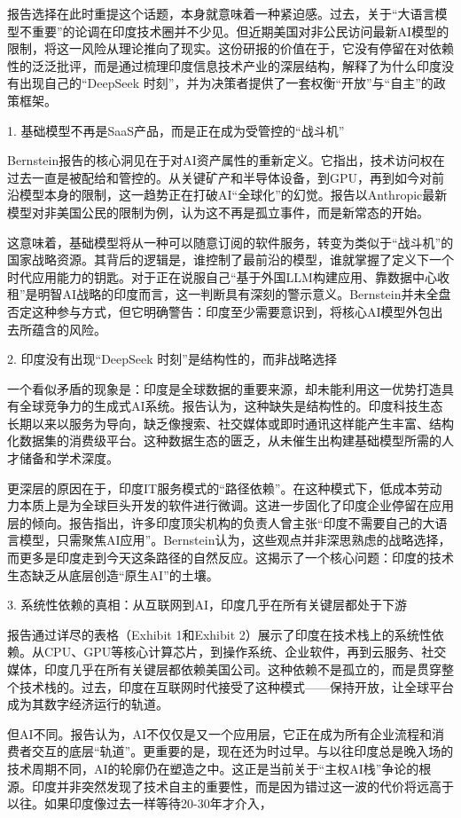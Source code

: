 \documentclass[11pt]{ctexart}
\begin{document}
报告选择在此时重提这个话题，本身就意味着一种紧迫感。过去，关于“大语言模型不重要”的论调在印度技术圈并不少见。但近期美国对非公民访问最新AI模型的限制，将这一风险从理论推向了现实。这份研报的价值在于，它没有停留在对依赖性的泛泛批评，而是通过梳理印度信息技术产业的深层结构，解释了为什么印度没有出现自己的“DeepSeek 时刻”，并为决策者提供了一套权衡“开放”与“自主”的政策框架。

1. 基础模型不再是SaaS产品，而是正在成为受管控的“战斗机”

Bernstein报告的核心洞见在于对AI资产属性的重新定义。它指出，技术访问权在过去一直是被配给和管控的。从关键矿产和半导体设备，到GPU，再到如今对前沿模型本身的限制，这一趋势正在打破AI“全球化”的幻觉。报告以Anthropic最新模型对非美国公民的限制为例，认为这不再是孤立事件，而是新常态的开始。

这意味着，基础模型将从一种可以随意订阅的软件服务，转变为类似于“战斗机”的国家战略资源。其背后的逻辑是，谁控制了最前沿的模型，谁就掌握了定义下一个时代应用能力的钥匙。对于正在说服自己“基于外国LLM构建应用、靠数据中心收租”是明智AI战略的印度而言，这一判断具有深刻的警示意义。Bernstein并未全盘否定这种参与方式，但它明确警告：印度至少需要意识到，将核心AI模型外包出去所蕴含的风险。

2. 印度没有出现“DeepSeek 时刻”是结构性的，而非战略选择

一个看似矛盾的现象是：印度是全球数据的重要来源，却未能利用这一优势打造具有全球竞争力的生成式AI系统。报告认为，这种缺失是结构性的。印度科技生态长期以来以服务为导向，缺乏像搜索、社交媒体或即时通讯这样能产生丰富、结构化数据集的消费级平台。这种数据生态的匮乏，从未催生出构建基础模型所需的人才储备和学术深度。

更深层的原因在于，印度IT服务模式的“路径依赖”。在这种模式下，低成本劳动力本质上是为全球巨头开发的软件进行微调。这进一步固化了印度企业停留在应用层的倾向。报告指出，许多印度顶尖机构的负责人曾主张“印度不需要自己的大语言模型，只需聚焦AI应用”。Bernstein认为，这些观点并非深思熟虑的战略选择，而更多是印度走到今天这条路径的自然反应。这揭示了一个核心问题：印度的技术生态缺乏从底层创造“原生AI”的土壤。

3. 系统性依赖的真相：从互联网到AI，印度几乎在所有关键层都处于下游

报告通过详尽的表格（Exhibit 1和Exhibit 2）展示了印度在技术栈上的系统性依赖。从CPU、GPU等核心计算芯片，到操作系统、企业软件，再到云服务、社交媒体，印度几乎在所有关键层都依赖美国公司。这种依赖不是孤立的，而是贯穿整个技术栈的。过去，印度在互联网时代接受了这种模式——保持开放，让全球平台成为其数字经济运行的轨道。

但AI不同。报告认为，AI不仅仅是又一个应用层，它正在成为所有企业流程和消费者交互的底层“轨道”。更重要的是，现在还为时过早。与以往印度总是晚入场的技术周期不同，AI的轮廓仍在塑造之中。这正是当前关于“主权AI栈”争论的根源。印度并非突然发现了技术自主的重要性，而是因为错过这一波的代价将远高于以往。如果印度像过去一样等待20-30年才介入，
\end{document}

